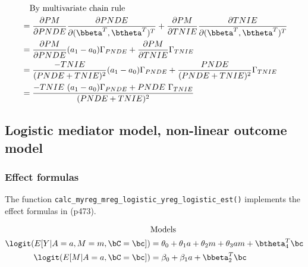 \documentclass[dvipdfmx,10pt]{article}
\begin{document}
\begin{align*}
  &~~~\text{By multivariate chain rule}\\
  &= \frac{\partial PM}{\partial PNDE}\frac{\partial PNDE}{\partial (\bbeta^{T},\btheta^{T})^{T}} + \frac{\partial PM}{\partial TNIE}\frac{\partial TNIE}{\partial (\bbeta^{T},\btheta^{T})^{T}}\\
  &= \frac{\partial PM}{\partial PNDE}(a_{1}-a_{0})\Gamma_{PNDE} + \frac{\partial PM}{\partial TNIE}\Gamma_{TNIE}\\
  &= \frac{-TNIE}{(PNDE+TNIE)^{2}}(a_{1}-a_{0})\Gamma_{PNDE} + \frac{PNDE}{(PNDE+TNIE)^{2}}\Gamma_{TNIE}\\
  &= \frac{-TNIE~(a_{1}-a_{0})\Gamma_{PNDE} + PNDE~\Gamma_{TNIE}}{(PNDE+TNIE)^{2}}\\
\end{align*}


\subsection{Logistic mediator model, non-linear outcome model}
\label{sec:org240e14b}
\subsubsection{Effect formulas}
\label{sec:orge089a06}
The function \texttt{calc\_myreg\_mreg\_logistic\_yreg\_logistic\_est()} implements the effect formulas in \cite{vanderweeleExplanationCausalInference2015} (p473).

\begin{align*}
  &\text{Models}\\
  \logit(E[Y|A=a,M=m,\bC=\bc]) &= \theta_{0} + \theta_{1}a + \theta_{2}m + \theta_{3}am + \btheta_{4}^{T}\bc\\
  \logit(E[M|A=a,\bC=\bc]) &= \beta_{0} + \beta_{1}a + \bbeta_{2}^{T}\bc
\end{align*}
\end{document}

